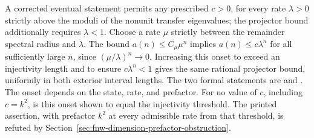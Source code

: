 \documentclass{article}
\begin{document}
A corrected eventual statement permits any prescribed $c>0$, for every rate
$\lambda>0$ strictly above the moduli of the nonunit transfer eigenvalues;
the projector bound additionally requires $\lambda<1$. Choose a rate
$\mu$ strictly between the remainder spectral radius and $\lambda$. The bound
$a(n)\leq C_\mu\mu^n$ implies $a(n)\leq c\lambda^n$ for all sufficiently
large $n$, since $(\mu/\lambda)^n\to0$. Increasing this onset to exceed an
injectivity length and to ensure $c\lambda^n<1$ gives the same rational
projector bound, uniformly in both exterior interval lengths. The two
formal statements are
and
.
The onset depends on the state, rate, and prefactor. For no value of $c$,
including $c=k^2$, is this onset shown to equal the injectivity threshold. The
printed assertion, with prefactor $k^2$ at every admissible rate from that
threshold, is refuted by
Section~\ref{sec:fnw-dimension-prefactor-obstruction}.
\end{document}

